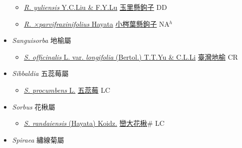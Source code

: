 \begin{itemize}
\begin{itemize}
        \item[] \href{http://www.theplantlist.org/tpl1.1/search?q=Rubus+yuliensis}{\textit{R. yuliensis} Y.C.Liu \& F.Y.Lu}   \href{\detokenize{http://taibnet.sinica.edu.tw/chi/taibnet_species_list.php?T2=玉里懸鉤子&T2_new_value=true&fr=y}}{玉里懸鉤子} DD
        \item[] \href{http://www.theplantlist.org/tpl1.1/search?q=Rubus+×parvifraxinifolius}{\textit{R. ×parvifraxinifolius} Hayata}   \href{\detokenize{http://taibnet.sinica.edu.tw/chi/taibnet_species_list.php?T2=小梣葉懸鉤子&T2_new_value=true&fr=y}}{小梣葉懸鉤子} NA$^h$
  \end{itemize}
 \item[] \textit{Sanguisorba} 地榆屬
                    
  \begin{itemize}
        \item[] \href{http://www.theplantlist.org/tpl1.1/search?q=Sanguisorba+officinalis+var.+longifolia}{\textit{S. officinalis} L. var. \textit{longifolia} (Bertol.) T.T.Yu \& C.L.Li}   \href{\detokenize{http://taibnet.sinica.edu.tw/chi/taibnet_species_list.php?T2=臺灣地榆&T2_new_value=true&fr=y}}{臺灣地榆} CR
  \end{itemize}
 \item[] \textit{Sibbaldia} 五蕊莓屬
                    
  \begin{itemize}
        \item[] \href{http://www.theplantlist.org/tpl1.1/search?q=Sibbaldia+procumbens}{\textit{S. procumbens} L.}   \href{\detokenize{http://taibnet.sinica.edu.tw/chi/taibnet_species_list.php?T2=五蕊莓&T2_new_value=true&fr=y}}{五蕊莓} LC
  \end{itemize}
 \item[] \textit{Sorbus} 花楸屬
                    
  \begin{itemize}
        \item[] \href{http://www.theplantlist.org/tpl1.1/search?q=Sorbus+randaiensis}{\textit{S. randaiensis} (Hayata) Koidz.}   \href{\detokenize{http://taibnet.sinica.edu.tw/chi/taibnet_species_list.php?T2=巒大花楸&T2_new_value=true&fr=y}}{巒大花楸}\# LC
  \end{itemize}
 \item[] \textit{Spiraea} 繡線菊屬
                    

\end{itemize}
